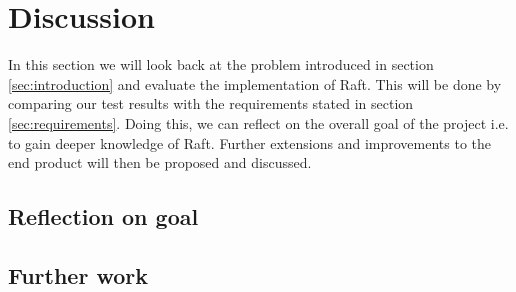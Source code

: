 \section{Discussion} %
\label{sec:discussion}
In this section we will look back at the problem introduced in section \ref{sec:introduction} and evaluate the implementation of Raft. This will be done by comparing our test results with the requirements stated in section \ref{sec:requirements}. Doing this, we can reflect on the overall goal of the project i.e. to gain deeper knowledge of Raft. Further extensions and improvements to the end product will then be proposed and discussed.

\subsection{Reflection on goal}

\subsection{Further work}




